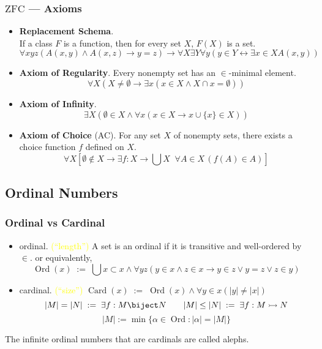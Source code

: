 \documentclass[UTF8,aspectratio=43,11pt,colorlinks,compress,openany]{beamer}%
\begin{document}
\begin{frame}\frametitle{$\mathrm{ZFC}$ --- Axioms}
	\begin{itemize}
		\item \textbf{Replacement Schema}.\\
		If a class $F$ is a function, then for every set $X$, $F(X)$ is a set.
		\[\forall xyz(A(x,y)\wedge A(x,z)\to y=z)\to\forall X\exists Y\forall y(y\in Y\leftrightarrow\exists x\in X A(x,y))\]
		\item \textbf{Axiom of Regularity}. Every nonempty set has an $\in$-minimal element.
		\[\forall X(X\neq\emptyset\to\exists x(x\in X\wedge X\cap x=\emptyset))\]
		\item \textbf{Axiom of Infinity}.
		\[\exists X(\emptyset\in X\wedge\forall x(x\in X\to x\cup\{x\}\in X))\]
		\item \textbf{Axiom of Choice} (AC). For any set $X$ of nonempty sets, there exists a choice function $f$ defined on $X$.
		\[\forall X\left[\emptyset\notin X\to\exists f: X\to\bigcup X\;\; \forall A\in X\,(f(A)\in A)\right]\]
	\end{itemize}
\end{frame}

\subsection{Ordinal Numbers}

\begin{frame}\frametitle{Ordinal vs Cardinal}
	\begin{itemize}
		\item ordinal. \textcolor{yellow}{(``length'')} A set is an ordinal if it is transitive and well-ordered by $\in$. or equivalently,
		\[\operatorname{Ord}(x)\;:=\;\bigcup x\subset x\wedge\forall yz(y\in x\wedge z\in x\to y\in z\vee y=z\vee z\in y)\]
		\item cardinal. \textcolor{yellow}{(``size'')}\quad
		$\operatorname{Card}(x)\;:=\;\operatorname{Ord}(x)\wedge\forall y\in x(|y|\neq|x|)$
		\[|M|=|N|\;:=\;\exists f: M\biject N\qquad |M|\leq|N|\;:=\;\exists f: M\rightarrowtail N\]
		\[|M|:=\min\{\alpha\in \operatorname{Ord}: |\alpha|=|M|\}\]
	\end{itemize}
	The infinite ordinal numbers that are cardinals are called alephs.
\end{frame}
\end{document}
